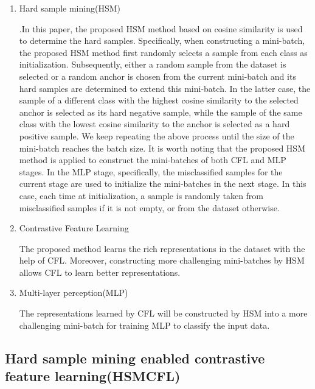 \documentclass[lettersize,journal]{IEEEtran}
\begin{document}
\begin{enumerate}
\item Hard sample mining(HSM)

.In this paper, the proposed HSM method based on cosine similarity is used to determine the hard samples. Specifically, when constructing a mini-batch, the proposed HSM method first randomly selects a sample from each class as initialization. Subsequently, either a random sample from the dataset is selected or a random anchor is chosen from the current mini-batch and its hard samples are determined to extend this mini-batch. In the latter case, the sample of a different class with the highest cosine similarity to the selected anchor is selected as its hard negative sample, while the sample of the same class with the lowest cosine similarity to the anchor is selected as a hard positive sample. We keep repeating the above process until the size of the mini-batch reaches the batch size. It is worth noting that the proposed HSM method is applied to construct the mini-batches of both CFL and MLP stages. In the MLP stage, specifically, the misclassified samples for the current stage are used to initialize the mini-batches in the next stage. In this case, each time at initialization, a sample is randomly taken from misclassified samples if it is not empty, or from the dataset otherwise. 


\item Contrastive Feature Learning

The proposed method learns the rich representations in the dataset with the help of CFL. Moreover, constructing more challenging mini-batches by HSM allows CFL to learn better representations.
 

\item Multi-layer perception(MLP)

The representations learned by CFL will be constructed by HSM into a more challenging mini-batch for training MLP to classify the input data.

\end{enumerate}

\subsection{Hard sample mining enabled contrastive feature learning(HSMCFL)}%
\end{document}
